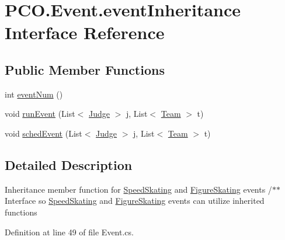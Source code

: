 \hypertarget{interfacePCO_1_1Event_1_1eventInheritance}{\section{P\+C\+O.\+Event.\+event\+Inheritance Interface Reference}
\label{interfacePCO_1_1Event_1_1eventInheritance}
}
\subsection*{Public Member Functions}
\begin{DoxyCompactItemize}
\item 
int \hyperlink{interfacePCO_1_1Event_1_1eventInheritance_a3c61b63b74b3db5a3cddd0b853dfcc26}{event\+Num} ()
\item 
void \hyperlink{interfacePCO_1_1Event_1_1eventInheritance_a0d5523c4803a10534acdf520f40e1e66}{run\+Event} (List$<$ \hyperlink{classPCO_1_1Judge}{Judge} $>$ j, List$<$ \hyperlink{classPCO_1_1Team}{Team} $>$ t)
\item 
void \hyperlink{interfacePCO_1_1Event_1_1eventInheritance_a6250c8bbdabaf5762298255c6a579aa8}{sched\+Event} (List$<$ \hyperlink{classPCO_1_1Judge}{Judge} $>$ j, List$<$ \hyperlink{classPCO_1_1Team}{Team} $>$ t)
\end{DoxyCompactItemize}


\subsection{Detailed Description}
Inheritance member function for \hyperlink{classPCO_1_1SpeedSkating}{Speed\+Skating} and \hyperlink{classPCO_1_1FigureSkating}{Figure\+Skating} events /$\ast$$\ast$ Interface so \hyperlink{classPCO_1_1SpeedSkating}{Speed\+Skating} and \hyperlink{classPCO_1_1FigureSkating}{Figure\+Skating} events can utilize inherited functions 

Definition at line 49 of file Event.\+cs.



